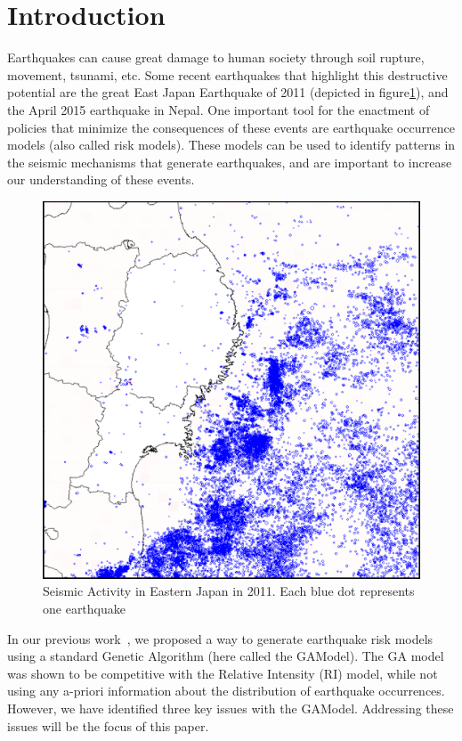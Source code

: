 \section{Introduction}\label{intro}

Earthquakes can cause great damage to human society through soil
rupture, movement, tsunami, etc. Some recent earthquakes that
highlight this destructive potential are the great East Japan
Earthquake of 2011 (depicted in figure\ref{GreatEastJapan}), and the
April 2015 earthquake in Nepal. One important tool for the enactment
of policies that minimize the consequences of these events are
earthquake occurrence models (also called risk models). These models
can be used to identify patterns in the seismic mechanisms that
generate earthquakes, and are important to increase our understanding
of these events.


\begin{figure}[]
\centering
\includegraphics[width=.45\textwidth]{img/earthquakes2011.png}
\caption{Seismic Activity in Eastern Japan in 2011. Each blue dot
  represents one earthquake}
\label{GreatEastJapan}
\end{figure}


In our previous work~\cite{ecta14}, we proposed a way to generate
earthquake risk models using a standard Genetic Algorithm (here called
the GAModel). The GA model was shown to be competitive with the
Relative Intensity (RI) model, while not using any a-priori
information about the distribution of earthquake occurrences. However,
we have identified three key issues with the GAModel. Addressing
these issues will be the focus of this paper.

